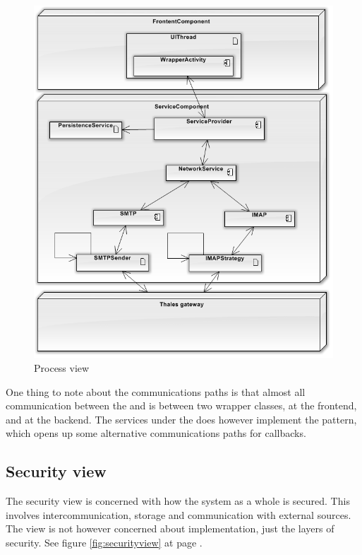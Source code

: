 \begin{figure}[H]
	\includegraphics[width=\textwidth]{processview.png}
	\caption{Process view}
	\label{fig:processview}
\end{figure}

\pagebreak

One thing to note about the communications paths is that almost all communication between the  and  is between two wrapper classes,  at the frontend, and  at the backend. The services under the  does however implement the  pattern, which opens up some alternative communications paths for callbacks.

\subsection{Security view}
The security view is concerned with how the system as a whole is secured. This involves intercommunication, storage and communication with external sources. The view is not however concerned about implementation, just the layers of security.
See figure \ref{fig:securityview} at page \pageref{fig:securityview}.

